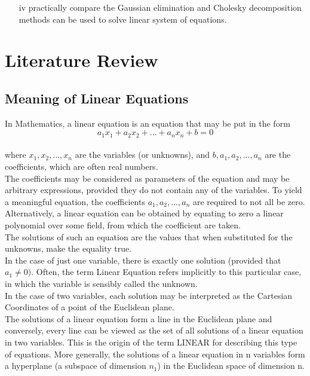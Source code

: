 \documentclass[a4paper, 12pt]{report}
\begin{document}
{\begin{enumerate}
          	\item[iv] practically compare the Gaussian elimination and Cholesky decomposition methods can be used to solve linear system of equations.
          \end{enumerate}
  
        
          
          \chapter{Literature Review}  
         \section{Meaning of Linear Equations} 
          In Mathematics, a linear equation is an equation that may be put in the form 
          \begin{equation}
         	a_1x_1 + a_2x_2 + ... + a_nx_n + b = 0 
          \end{equation}\\
           where $x_1, x_2, ..., x_n$ are the variables (or unknowns), and $b, a_1, a_2, ..., a_n$ are the coefficients, which are often real numbers.\\
           
           The coefficients may be considered as parameters of the equation and may be arbitrary expressions, provided they do not contain any of the variables. To yield a meaningful equation, the coefficients $a_1, a_2, ..., a_n$ are required to not all be zero.\\
           Alternatively, a linear equation can be obtained by equating to zero a linear polynomial over some field, from which the coefficient are taken.\\
           The solutions of such an equation are the values that when substituted for the unknowns, make the equality true.\\
           
           In the case of just one variable, there is exactly one solution (provided that $a_1 \neq 0)$. Often, the term Linear Equation refers implicitly to this particular case, in which the variable is sensibly called the unknown.\\
           
           In the case of two variables, each solution may be interpreted as the Cartesian Coordinates of a point of the Euclidean plane.\\
           The solutions of a linear equation form a line in the Euclidean plane and conversely, every line can be viewed as the set of all solutions of a linear equation in two variables. This is the origin of the term LINEAR for describing this type of equations. More generally, the solutions of a linear equation in n variables form a hyperplane (a subspace of dimension $n_1$) in the Euclidean space of dimension n.\\
           
}
\end{document}
